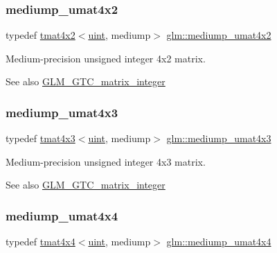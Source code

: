 \subsubsection{\texorpdfstring{mediump\+\_\+umat4x2}{mediump\_umat4x2}}
{\footnotesize\ttfamily typedef \hyperlink{structglm_1_1tmat4x2}{tmat4x2}$<$\hyperlink{group__core__precision_ga4fd29415871152bfb5abd588334147c8}{uint}, mediump$>$ \hyperlink{group__gtc__matrix__integer_ga9dd5ce011ca43d90cf1b94084c7e90ac}{glm\+::mediump\+\_\+umat4x2}}

Medium-\/precision unsigned integer 4x2 matrix. \begin{DoxySeeAlso}{See also}
\hyperlink{group__gtc__matrix__integer}{G\+L\+M\+\_\+\+G\+T\+C\+\_\+matrix\+\_\+integer} 
\end{DoxySeeAlso}
\mbox{\label{group__gtc__matrix__integer_gac91ed5aa76fe160d5ab5d31e2b94d95b}} 
\subsubsection{\texorpdfstring{mediump\+\_\+umat4x3}{mediump\_umat4x3}}
{\footnotesize\ttfamily typedef \hyperlink{structglm_1_1tmat4x3}{tmat4x3}$<$\hyperlink{group__core__precision_ga4fd29415871152bfb5abd588334147c8}{uint}, mediump$>$ \hyperlink{group__gtc__matrix__integer_gac91ed5aa76fe160d5ab5d31e2b94d95b}{glm\+::mediump\+\_\+umat4x3}}

Medium-\/precision unsigned integer 4x3 matrix. \begin{DoxySeeAlso}{See also}
\hyperlink{group__gtc__matrix__integer}{G\+L\+M\+\_\+\+G\+T\+C\+\_\+matrix\+\_\+integer} 
\end{DoxySeeAlso}
\mbox{\label{group__gtc__matrix__integer_ga7141a9d9f1c26521e397be34d19c1b8f}} 
\subsubsection{\texorpdfstring{mediump\+\_\+umat4x4}{mediump\_umat4x4}}
{\footnotesize\ttfamily typedef \hyperlink{structglm_1_1tmat4x4}{tmat4x4}$<$\hyperlink{group__core__precision_ga4fd29415871152bfb5abd588334147c8}{uint}, mediump$>$ \hyperlink{group__gtc__matrix__integer_ga7141a9d9f1c26521e397be34d19c1b8f}{glm\+::mediump\+\_\+umat4x4}}

